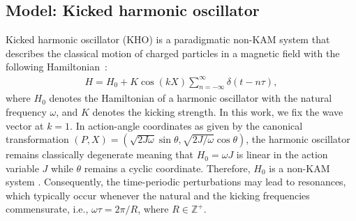 \documentclass[amsmath,nobibnotes,aps,amssymb,pra, prl,aps,showpacs,superscriptaddress,twocolumn, longbibliography, reprint]{revtex4-2}
\begin{document}
\subsection{Model: Kicked harmonic oscillator}
\label{section-2B}
Kicked harmonic oscillator (KHO) is a paradigmatic non-KAM system that describes the classical motion of charged particles in a magnetic field with the following Hamiltonian~\cite{chernikov1989symmetry, afanasiev1990width, reichl2021transition, rechester1980calculation, ichikawa1987stochastic, ishizaki1991anomalous, daly1994classical, borgonovi1995translational, zaslavsky2007physics}: 
\begin{eqnarray}
H=H_0+ K\cos(kX)\sum_{n=-\infty}^{\infty}\delta(t-n\tau),
\end{eqnarray}
where $H_0$ denotes the Hamiltonian of a harmonic oscillator with the natural frequency $\omega$, and $K$ denotes the kicking strength. In this work, we fix the wave vector at $k=1$. In action-angle coordinates as given by the canonical transformation $(P, X)=(\sqrt{2J\omega}\sin\theta, \sqrt{2J/\omega}\cos\theta)$, the harmonic oscillator remains classically degenerate meaning that $H_0=\omega J$ is linear in the action variable $J$ while $\theta$ remains a cyclic coordinate. Therefore, $H_0$ is a non-KAM system \cite{poschel2009lecture}. Consequently, the time-periodic perturbations may lead to resonances, which typically occur whenever the natural and the kicking frequencies commensurate, i.e.,  $\omega\tau=2\pi/R$, where $R\in\mathbb{Z}^{+}$. 
\end{document}
